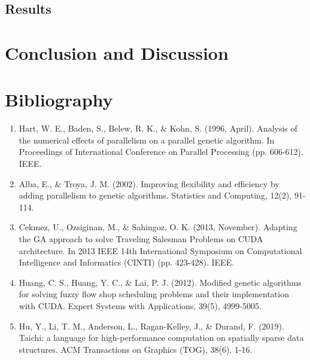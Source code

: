 \documentclass[conference]{IEEEtran}
\begin{document}
\subsection{Results}

\section{Conclusion and Discussion}

\section{Bibliography}

\begin{enumerate}
    \item Hart, W. E., Baden, S., Belew, R. K., \& Kohn, S. (1996, April). Analysis of
          the numerical effects of parallelism on a parallel genetic algorithm. In
          Proceedings of International Conference on Parallel Processing (pp. 606-612).
          IEEE.
    \item Alba, E., \& Troya, J. M. (2002). Improving flexibility and efficiency by
          adding parallelism to genetic algorithms. Statistics and Computing, 12(2),
          91-114.
    \item Cekmez, U., Ozsiginan, M., \& Sahingoz, O. K. (2013, November). Adapting the GA
          approach to solve Traveling Salesman Problems on CUDA architecture. In 2013
          IEEE 14th International Symposium on Computational Intelligence and Informatics
          (CINTI) (pp. 423-428). IEEE.
    \item Huang, C. S., Huang, Y. C., \& Lai, P. J. (2012). Modified genetic algorithms
          for solving fuzzy flow shop scheduling problems and their implementation with
          CUDA. Expert Systems with Applications, 39(5), 4999-5005.
    \item Hu, Y., Li, T. M., Anderson, L., Ragan-Kelley, J., \& Durand, F. (2019).
          Taichi: a language for high-performance computation on spatially sparse data
          structures. ACM Transactions on Graphics (TOG), 38(6), 1-16.
\end{enumerate}
\end{document}
